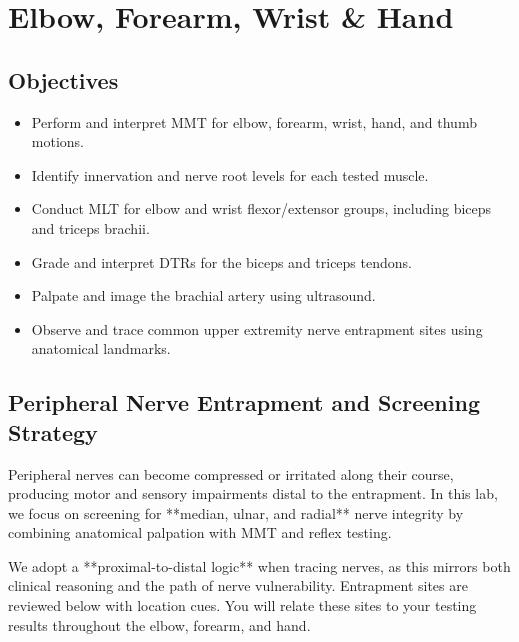 \chapter{Elbow, Forearm, Wrist \& Hand}\label{chp:distal_ue}

\section*{Objectives}
\begin{itemize}
  \item Perform and interpret MMT for elbow, forearm, wrist, hand, and thumb motions.
  \item Identify innervation and nerve root levels for each tested muscle.
  \item Conduct MLT for elbow and wrist flexor/extensor groups, including biceps and triceps brachii.
  \item Grade and interpret DTRs for the biceps and triceps tendons.
  \item Palpate and image the brachial artery using ultrasound.
  \item Observe and trace common upper extremity nerve entrapment sites using anatomical landmarks.
\end{itemize}

\section*{Peripheral Nerve Entrapment and Screening Strategy}

\noindent
Peripheral nerves can become compressed or irritated along their course, producing motor and sensory impairments distal to the entrapment. In this lab, we focus on screening for **median, ulnar, and radial** nerve integrity by combining anatomical palpation with MMT and reflex testing.

\vspace{0.5cm}

We adopt a **proximal-to-distal logic** when tracing nerves, as this mirrors both clinical reasoning and the path of nerve vulnerability. Entrapment sites are reviewed below with location cues. You will relate these sites to your testing results throughout the elbow, forearm, and hand.

\vspace{0.5cm}

